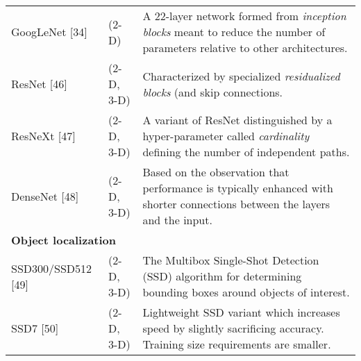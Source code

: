 \begin{table}[!htb]
\begin{tabular*}{\textwidth}{ll@{\extracolsep{\fill}}l}
  GoogLeNet [34] & (2-D) & 
    \begin{minipage}[t]{0.6\columnwidth}%
        A 22-layer network formed from {\em inception blocks} meant
        to reduce the number of parameters relative to other architectures.
    \end{minipage} \\ \vspace{0.2cm} 
  ResNet [46]  & (2-D, 3-D) & 
    \begin{minipage}[t]{0.6\columnwidth}%
        Characterized by specialized {\em residualized blocks} (and
        skip connections. %
    \end{minipage} \\ \vspace{0.2cm} 
  ResNeXt [47] & (2-D, 3-D) &
    \begin{minipage}[t]{0.6\columnwidth}%
        A variant of ResNet distinguished by a hyper-parameter called 
        {\em cardinality} defining the number of independent paths. %
    \end{minipage} \\ \vspace{0.3cm} 
  DenseNet [48] & (2-D, 3-D) & 
    \begin{minipage}[t]{0.6\columnwidth}%
        Based on the observation that performance is typically enhanced 
        with shorter connections between the layers and the input.%
    \end{minipage} \\
\midrule    
\multicolumn{3}{l}{\textbf{Object localization}} 
  \vspace{0.25cm} \\ \vspace{0.2cm} 
  SSD300/SSD512 [49] & (2-D, 3-D) & 
    \begin{minipage}[t]{0.6\columnwidth}%
        The Multibox Single-Shot Detection (SSD) algorithm for
        determining bounding boxes around objects of interest. %
    \end{minipage} \\ \vspace{0.2cm} 
  SSD7 [50] & (2-D, 3-D) & 
    \begin{minipage}[t]{0.6\columnwidth}%
        Lightweight SSD variant which increases speed by slightly sacrificing
        accuracy.  Training size requirements are smaller. %
  \end{minipage} \\
\bottomrule
\end{tabular*}
\end{table}



